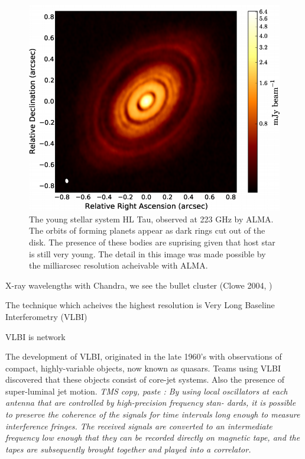 \begin{figure}
\begin{center}

\includegraphics[width=\columnwidth]{Images/hl_tau}
\caption{The young stellar system HL Tau, observed at 223 GHz by ALMA. The orbits of forming planets appear as dark rings cut out of the disk. The presence of these bodies are suprising given that host star is still very young. The detail in this image was made possible by the milliarcsec resolution acheivable with ALMA. \label{fig:hl_tau}}

\end{center}
\end{figure}

X-ray wavelengths with Chandra, we see the bullet cluster (Clowe 2004, )

The technique which acheives the highest resolution is Very Long Baseline Interferometry (VLBI)




VLBI is  network 

The development of VLBI, originated in the late 1960's with observations of compact, highly-variable objects, now known as quasars. Teams using VLBI discovered that these objects consist of core-jet systems. Also the presence of super-luminal jet motion. \textit{TMS copy, paste : By using local
oscillators at each antenna that are controlled by high-precision frequency stan-
dards, it is possible to preserve the coherence of the signals for time intervals
long enough to measure interference fringes. The received signals are converted
to an intermediate frequency low enough that they can be recorded directly on
magnetic tape, and the tapes are subsequently brought together and played into
a correlator.}

